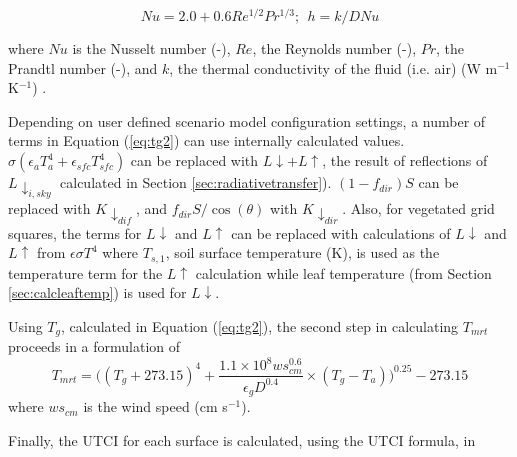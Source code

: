 \documentclass[final,3p,times,authoryear]{elsarticle}
\begin{document}
\begin{equation}\label{eq:h}
Nu = 2.0 + 0.6Re^{1/2}Pr^{1/3};  ~~h = k / D Nu
\end{equation}

where $Nu$ is the Nusselt number (-),
$Re$, the Reynolds number (-),
$Pr$, the Prandtl number (-), and 
$k$, the thermal conductivity of the fluid (i.e. air) (W m$^{-1}$K$^{-1}$) \citep{Liljegren2008}.



Depending on user defined scenario model configuration settings, a number of terms in Equation (\ref{eq:tg2}) can use internally calculated values. $\sigma (\epsilon_{a} T_{a}^{4} + \epsilon_{sfc} T_{sfc}^{4} )$ can be replaced with $L\downarrow + L\uparrow$, the result of reflections of $L \downarrow_{i,sky}$ calculated in Section \ref{sec:radiativetransfer}). $(1-f_{dir})S$ can be replaced with $K \downarrow_{dif}$, and $f_{dir}S/ \cos(\theta)$ with $K \downarrow_{dir}$. Also, for vegetated grid squares, the terms for $L\downarrow$ and $L\uparrow$ can be replaced with calculations of $L\downarrow$ and $L\uparrow$ from $\epsilon \sigma T^{4}$ where $T_{s,1}$, soil surface temperature (K), is used as the temperature term for the $L\uparrow$ calculation while leaf temperature (from Section \ref{sec:calcleaftemp}) is used for $L\downarrow$. 

Using $T_{g}$, calculated in Equation (\ref{eq:tg2}), the second step in calculating $T_{mrt}$ proceeds in a formulation of \cite{Kantor2011} 
\begin{equation}\label{eq:tmrtbucket}
  T_{mrt} = 
  \bigg(
   (T_{g}+273.15)^{4} + 
    \frac{1.1 \times 10^{8}  ws_{cm}^{0.6}}{\epsilon_{g}  D^{0.4}}
    \times 
     (T_{g}-T_{a})
    \bigg)^{0.25} - 273.15
\end{equation}
 where $ws_{cm}$ is the wind speed (cm s$^{-1}$).

Finally, the UTCI for each surface is calculated, using the \cite{Brode2009u} UTCI formula, in 
\end{document}
